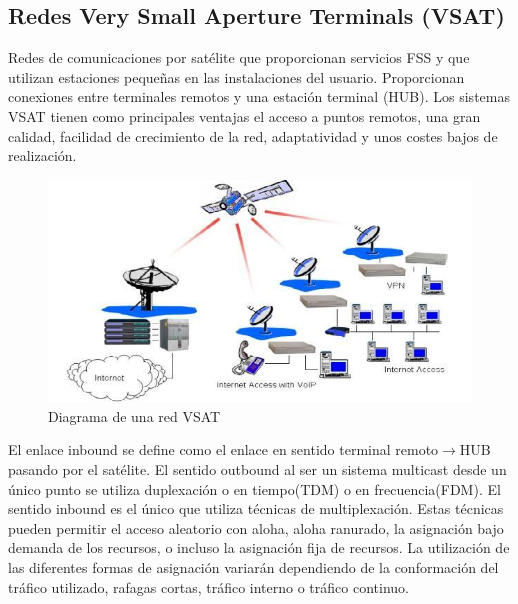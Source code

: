 	\subsection{Redes Very Small Aperture Terminals (\acrshort{VSAT})}
	\label{sub:vsat}
		Redes de comunicaciones por satélite que proporcionan servicios FSS y que utilizan estaciones pequeñas en las instalaciones del usuario. Proporcionan conexiones entre terminales remotos y una estación terminal (HUB). Los sistemas \acrshort{VSAT} tienen como principales ventajas el acceso a puntos remotos, una gran calidad, facilidad de crecimiento de la red, adaptatividad y unos costes bajos de realización.
		\begin{figure}[H]
		\centering
		\includegraphics[width=\textwidth]{Imagen/diavsat.jpg}
		\caption{Diagrama de una red \acrshort{VSAT}}
		\end{figure}
		El enlace inbound se define como el enlace en sentido terminal remoto$\to$HUB pasando por el satélite. El sentido outbound al ser un sistema multicast desde un único punto se utiliza duplexación o en tiempo(TDM) o en frecuencia(FDM). El sentido inbound es el único que utiliza técnicas de multiplexación. Estas técnicas pueden permitir el acceso aleatorio con aloha, aloha ranurado, la asignación bajo demanda de los recursos, o incluso la asignación fija de recursos. La utilización de las diferentes formas de asignación variarán dependiendo de la conformación del tráfico utilizado, rafagas cortas, tráfico interno o tráfico continuo.
